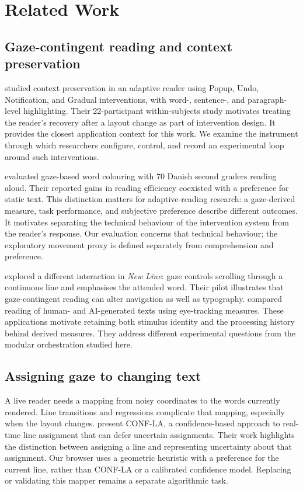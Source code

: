 \section{Related Work}
\label{sec:related}

\subsection{Gaze-contingent reading and context preservation}

\citet{jensen2025context} studied context preservation in an adaptive reader using Popup, Undo, Notification, and Gradual interventions, with word-, sentence-, and paragraph-level highlighting. Their 22-participant within-subjects study motivates treating the reader's recovery after a layout change as part of intervention design. It provides the closest application context for this work. We examine the instrument through which researchers configure, control, and record an experimental loop around such interventions.

\citet{rummens2026highlighting} evaluated gaze-based word colouring with 70 Danish second graders reading aloud. Their reported gains in reading efficiency coexisted with a preference for static text. This distinction matters for adaptive-reading research: a gaze-derived measure, task performance, and subjective preference describe different outcomes. It motivates separating the technical behaviour of the intervention system from the reader's response. Our evaluation concerns that technical behaviour; the exploratory movement proxy is defined separately from comprehension and preference.

\citet{medan2024newline} explored a different interaction in \textit{New Line}: gaze controls scrolling through a continuous line and emphasises the attended word. Their pilot illustrates that gaze-contingent reading can alter navigation as well as typography. \citet{ilyas2025mind} compared reading of human- and AI-generated texts using eye-tracking measures. These applications motivate retaining both stimulus identity and the processing history behind derived measures. They address different experimental questions from the modular orchestration studied here.

\subsection{Assigning gaze to changing text}

A live reader needs a mapping from noisy coordinates to the words currently rendered. Line transitions and regressions complicate that mapping, especially when the layout changes. \citet{kaltenberger2026line} present CONF-LA, a confidence-based approach to real-time line assignment that can defer uncertain assignments. Their work highlights the distinction between assigning a line and representing uncertainty about that assignment. Our browser uses a geometric heuristic with a preference for the current line, rather than CONF-LA or a calibrated confidence model. Replacing or validating this mapper remains a separate algorithmic task.


